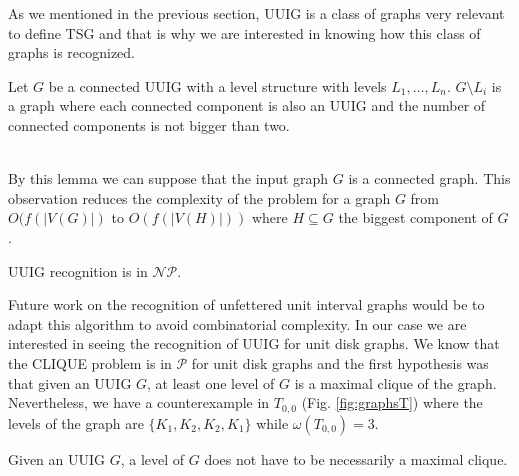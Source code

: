 As we mentioned in the previous section, UUIG is a class of graphs very relevant to define TSG and that is why we are interested in knowing how this class of graphs is recognized.

\begin{lemma}
  Let $G$ be a connected UUIG with a level structure with levels $L_1,\dots,L_n$. $G\setminus L_i$ is a graph where each connected component is also an UUIG and the number of connected components is not bigger than two.
\end{lemma}

\\

By this lemma we can suppose that the input graph $G$ is a connected graph. This observation reduces the complexity of the problem for a graph $G$ from $O(f(|V(G)|)$ to $O(f(|V(H)|))$ where $H \subseteq G$ the biggest component of $G$.

\begin{theorem}
  UUIG recognition is in $\mathcal{NP}$.
\end{theorem}


Future work on the recognition of unfettered unit interval graphs would be to adapt this algorithm to avoid combinatorial complexity. In our case we are interested in seeing the recognition of UUIG for unit disk graphs. We know that the CLIQUE problem is in $\mathcal{P}$ for unit disk graphs \cite{CLARK1990165} and the first hypothesis was that given an UUIG $G$, at least one level of $G$ is a maximal clique of the graph. Nevertheless, we have a counterexample in $T_{0,0}$ (Fig. \ref{fig:graphsT}) where the levels of the graph are $\{K_1, K_2, K_2, K_1\}$ while $\omega(T_{0,0}) = 3$.

\begin{obs}
  Given an UUIG $G$, a level of $G$ does not have to be necessarily a maximal clique.
\end{obs}
